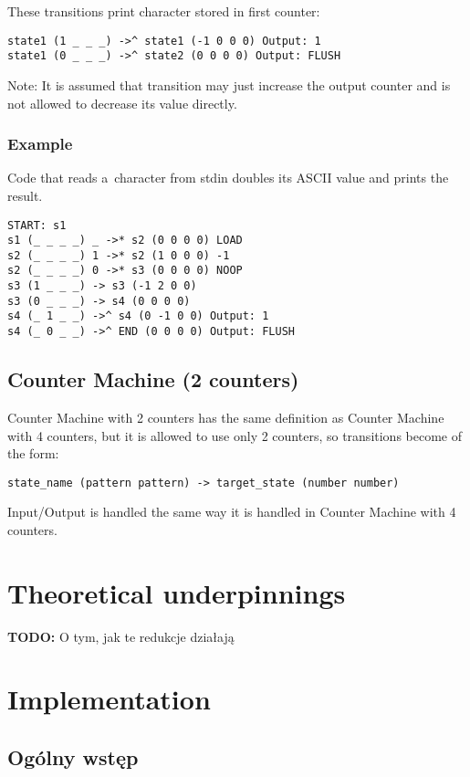 \documentclass[english,shortabstract,mgr]{iithesis}
\newcommand{\todo}[1]{\textbf{TODO:} #1}
\begin{document}
These transitions print character stored in first counter:
\begin{verbatim}
state1 (1 _ _ _) ->^ state1 (-1 0 0 0) Output: 1
state1 (0 _ _ _) ->^ state2 (0 0 0 0) Output: FLUSH
\end{verbatim}

Note: It is assumed that transition may just increase the output counter
and is not allowed to decrease its value directly.


\subsection{Example}

Code that reads a~character from stdin doubles its ASCII value and prints the result.
\begin{verbatim}
START: s1
s1 (_ _ _ _) _ ->* s2 (0 0 0 0) LOAD
s2 (_ _ _ _) 1 ->* s2 (1 0 0 0) -1
s2 (_ _ _ _) 0 ->* s3 (0 0 0 0) NOOP
s3 (1 _ _ _) -> s3 (-1 2 0 0)
s3 (0 _ _ _) -> s4 (0 0 0 0)
s4 (_ 1 _ _) ->^ s4 (0 -1 0 0) Output: 1
s4 (_ 0 _ _) ->^ END (0 0 0 0) Output: FLUSH
\end{verbatim}

\section {Counter Machine (2 counters)}

Counter Machine with 2 counters has the same definition as
Counter Machine with 4 counters, but it is allowed to use only
2 counters, so transitions become of the form:

\begin{verbatim}
state_name (pattern pattern) -> target_state (number number)
\end{verbatim}

Input/Output is handled the same way it is handled in Counter Machine with 4 counters.


\chapter{Theoretical underpinnings}

\todo{O tym, jak te redukcje działają}

\chapter{Implementation}

\section{Ogólny wstęp}
\end{document}
